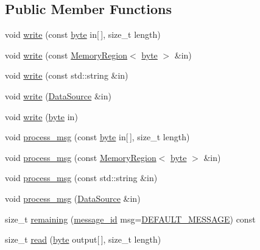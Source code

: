 \subsection*{Public Member Functions}
\begin{DoxyCompactItemize}
\item 
void \hyperlink{classBotan_1_1Pipe_a8a92fb4ba446850ecd9df56a2ce411e7}{write} (const \hyperlink{namespaceBotan_a7d793989d801281df48c6b19616b8b84}{byte} in\mbox{[}$\,$\mbox{]}, size\-\_\-t length)
\item 
void \hyperlink{classBotan_1_1Pipe_a8344fafba4e88df0ffc349c5f61fc6df}{write} (const \hyperlink{classBotan_1_1MemoryRegion}{Memory\-Region}$<$ \hyperlink{namespaceBotan_a7d793989d801281df48c6b19616b8b84}{byte} $>$ \&in)
\item 
void \hyperlink{classBotan_1_1Pipe_a574bb78b2e9bcc780ed0f7fc829c1f54}{write} (const std\-::string \&in)
\item 
void \hyperlink{classBotan_1_1Pipe_aae55aab04302c14cc1ad13165292be5a}{write} (\hyperlink{classBotan_1_1DataSource}{Data\-Source} \&in)
\item 
void \hyperlink{classBotan_1_1Pipe_a876b559b39cfc517d0115fae0a0a7af0}{write} (\hyperlink{namespaceBotan_a7d793989d801281df48c6b19616b8b84}{byte} in)
\item 
void \hyperlink{classBotan_1_1Pipe_aa08ced5dec4af2c2d528cb1e547671de}{process\-\_\-msg} (const \hyperlink{namespaceBotan_a7d793989d801281df48c6b19616b8b84}{byte} in\mbox{[}$\,$\mbox{]}, size\-\_\-t length)
\item 
void \hyperlink{classBotan_1_1Pipe_a86b7bb3f326cc864b139493a3f25550c}{process\-\_\-msg} (const \hyperlink{classBotan_1_1MemoryRegion}{Memory\-Region}$<$ \hyperlink{namespaceBotan_a7d793989d801281df48c6b19616b8b84}{byte} $>$ \&in)
\item 
void \hyperlink{classBotan_1_1Pipe_a56da4127f763fa0a852b92e2976973cc}{process\-\_\-msg} (const std\-::string \&in)
\item 
void \hyperlink{classBotan_1_1Pipe_aa6287b394df6a8a35beaf534228d99f8}{process\-\_\-msg} (\hyperlink{classBotan_1_1DataSource}{Data\-Source} \&in)
\item 
size\-\_\-t \hyperlink{classBotan_1_1Pipe_a5d5b734826c8d3d46fe8c808bc9a0e50}{remaining} (\hyperlink{classBotan_1_1Pipe_a122c19120c1c21f270b6b6225ca9883c}{message\-\_\-id} msg=\hyperlink{classBotan_1_1Pipe_a75278149a3ca86f19db144049cfa2ed3}{D\-E\-F\-A\-U\-L\-T\-\_\-\-M\-E\-S\-S\-A\-G\-E}) const 
\item 
size\-\_\-t \hyperlink{classBotan_1_1Pipe_a99168f7c2fda2aaa4770a7aeb9d775e0}{read} (\hyperlink{namespaceBotan_a7d793989d801281df48c6b19616b8b84}{byte} output\mbox{[}$\,$\mbox{]}, size\-\_\-t length)

\end{DoxyCompactItemize}
